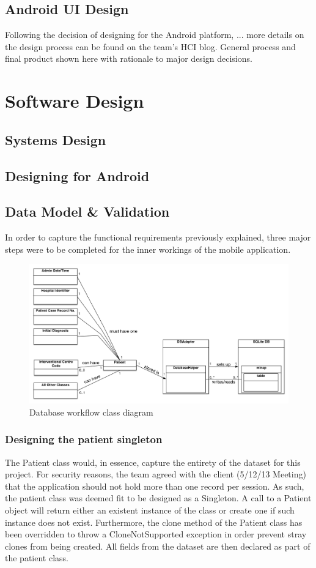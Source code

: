 \documentclass[12pt,a4paper,oneside,titlepage]{article}
\begin{document}
\subsection{Android UI Design}
Following the decision of designing for the Android platform,  ... more details on the design process can be found on the team's HCI blog.  General process and final product shown here with rationale to major design decisions.

\newpage
\section{Software Design}
\subsection{Systems Design}
\subsection{Designing for Android}
\subsection{Data Model \& Validation}
In order to capture the functional requirements previously explained, three major steps were to be completed for the inner workings of the mobile application.

\begin{figure}[h!]
\centering
\includegraphics[scale=0.45]{img/database-class-diagram.png}
\caption{Database workflow class diagram}
\end{figure}

\subsubsection{Designing the patient singleton}
The Patient class would, in essence, capture the entirety of the dataset for this project. For security reasons, the team agreed with the client (5/12/13 Meeting) that the application should not hold more than one record per session. As such, the patient class was deemed fit to be designed as a Singleton. A call to a Patient object will return either an existent instance of the class or create one if such instance does not exist. Furthermore, the clone method of the Patient class has been overridden to throw a CloneNotSupported exception in order prevent stray clones from being created. All fields from the dataset are then declared as part of the patient class.
\end{document}
